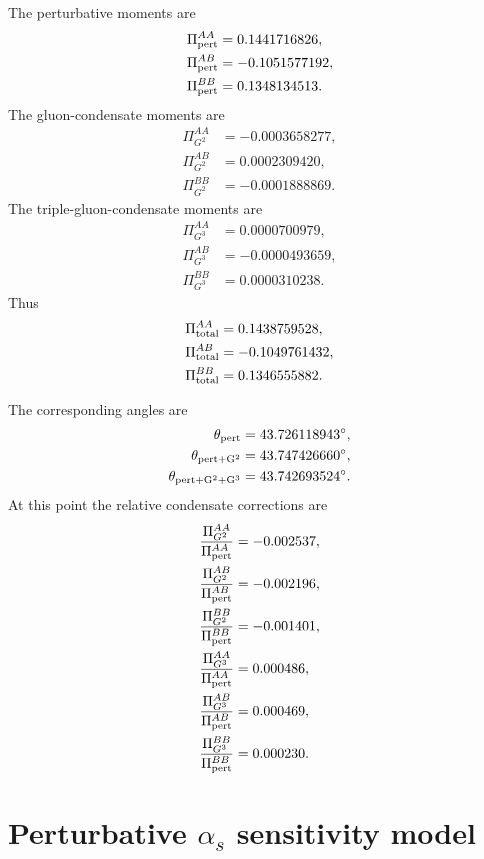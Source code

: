 \documentclass[11pt]{article}
\begin{document}
The perturbative moments are
\begin{align}
  \Pi_{\rm pert}^{AA} &= 0.1441716826,\\
  \Pi_{\rm pert}^{AB} &= -0.1051577192,\\
  \Pi_{\rm pert}^{BB} &= 0.1348134513.
\end{align}
The gluon-condensate moments are
\begin{align}
  \Pi_{G^2}^{AA} &= -0.0003658277,\\
  \Pi_{G^2}^{AB} &= 0.0002309420,\\
  \Pi_{G^2}^{BB} &= -0.0001888869.
\end{align}
The triple-gluon-condensate moments are
\begin{align}
  \Pi_{G^3}^{AA} &= 0.0000700979,\\
  \Pi_{G^3}^{AB} &= -0.0000493659,\\
  \Pi_{G^3}^{BB} &= 0.0000310238.
\end{align}
Thus
\begin{align}
  \Pi_{\rm total}^{AA} &= 0.1438759528,\\
  \Pi_{\rm total}^{AB} &= -0.1049761432,\\
  \Pi_{\rm total}^{BB} &= 0.1346555882.
\end{align}

The corresponding angles are
\begin{align}
  \theta_{\rm pert} &= 43.726118943^\circ,\\
  \theta_{\rm pert+G^2} &= 43.747426660^\circ,\\
  \theta_{\rm pert+G^2+G^3} &= 43.742693524^\circ.
\end{align}
At this point the relative condensate corrections are
\begin{align}
  \frac{\Pi_{G^2}^{AA}}{\Pi_{\rm pert}^{AA}} &= -0.002537,\\
  \frac{\Pi_{G^2}^{AB}}{\Pi_{\rm pert}^{AB}} &= -0.002196,\\
  \frac{\Pi_{G^2}^{BB}}{\Pi_{\rm pert}^{BB}} &= -0.001401,\\
  \frac{\Pi_{G^3}^{AA}}{\Pi_{\rm pert}^{AA}} &= 0.000486,\\
  \frac{\Pi_{G^3}^{AB}}{\Pi_{\rm pert}^{AB}} &= 0.000469,\\
  \frac{\Pi_{G^3}^{BB}}{\Pi_{\rm pert}^{BB}} &= 0.000230.
\end{align}

\section{Perturbative \texorpdfstring{$\alpha_s$}{alpha-s} sensitivity model}
\end{document}
